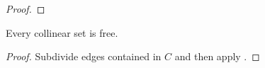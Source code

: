 \documentclass{patmorin}
\begin{document}
\begin{proof}
%
\end{proof}

\begin{cor}
  Every collinear set is free.
\end{cor}

\begin{proof}
   Subdivide edges contained in $C$ and then apply .
\end{proof}




\end{document}
